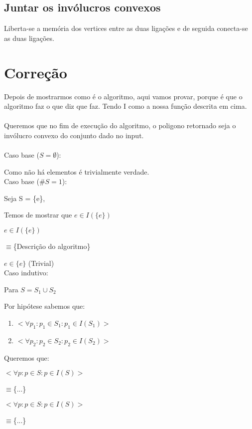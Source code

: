 \documentclass[11pt]{article}
\begin{document}
\subsection{ Juntar os invólucros convexos } 
Liberta-se a memória dos vertices entre as duas ligações e de seguida 
conecta-se as duas ligações.


\section{Correção}
Depois de mostrarmos como é o algoritmo,
aqui vamos provar, porque é que o algoritmo faz o que diz que faz.
Tendo I como a nossa função descrita em cima.\\
\\
Queremos que no fim de execução do algoritmo, o poligono
retornado seja o invólucro convexo do conjunto dado 
no input.\\
\\
Caso base ($S = \emptyset$):\par
    Como não há elementos é trivialmente verdade.\\
Caso base ($\#S = 1$):\par
    Seja S = \{e\},\par
    Temos de mostrar que $e \in I(\{e\})$\par
    $e \in I(\{e\})$\par
    $\equiv$\{Descrição do algoritmo\}\par
    $e \in \{e\}$ (Trivial)\\
Caso indutivo:\par
    Para $S = S_1 \cup S_2$\par
    Por hipótese sabemos que:\par
    \begin{enumerate}
        \item 
            $<\forall p_1 : p_1 \in S_1 : 
                p_1 \in I(S_1)
            >$
        \item 
            $<\forall p_2 : p_2 \in S_2 : 
                p_2 \in I(S_2)
            >$
    \end{enumerate}\par
    Queremos que:\par
    $<\forall p : p \in S : 
        p \in I(S)
    >$\par
    $\equiv$\{...\}\par
    $<\forall p : p \in S : 
        p \in I(S)
    >$\par
    $\equiv$\{...\}\par
\end{document}
